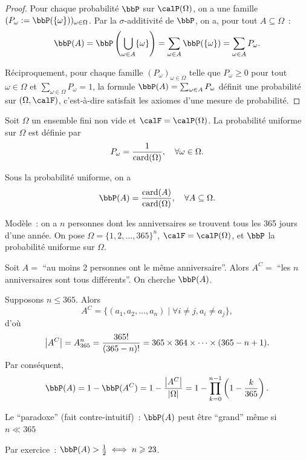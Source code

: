 \begin{proof}
    Pour chaque probabilité $\bbP$ sur $\calP(\Omega)$,
    on a une famille $(P_\omega := \bbP(\{ \omega \}))_{\omega \in \Omega}$.
    Par la $\sigma$-additivité de $\bbP$, on a, pour tout $A \subseteq \Omega$~:
    \[ \bbP(A) = \bbP \left(\bigcup_{\omega \in A} \{ \omega \} \right)
        = \sum_{\omega \in A} \bbP(\{ \omega \}) = \sum_{\omega \in A} P_\omega. \]

    Réciproquement, pour chaque famille $(P_\omega)_{\omega \in \Omega}$ telle que
    $P_\omega \geqslant 0$ pour tout $\omega \in \Omega$ et $\sum_{\omega \in \Omega} P_\omega = 1$,
    la formule $\bbP(A) = \sum_{\omega \in A} P_\omega$ définit une probabilité sur $(\Omega, \calF)$,
    c'est-à-dire satisfait les axiomes d'une mesure de probabilité.
\end{proof}

\begin{exem}
    Soit $\Omega$ un ensemble fini non vide et $\calF = \calP(\Omega)$.
    La probabilité uniforme sur $\Omega$ est définie par
    \[ P_\omega = \frac{1}{\operatorname{card}(\Omega)}, \quad \forall \omega \in \Omega. \]

    Sous la probabilité uniforme, on a
    \[ \bbP(A) = \frac{\card(A)}{\card(\Omega)}, \quad \forall A \subseteq \Omega. \]
\end{exem}

\begin{exem}
    Modèle~: on a $n$ personnes dont les anniversaires se trouvent tous les 365 jours d'une année.
    On pose $\Omega = \{ 1, 2, \ldots, 365 \}^n$, $\calF = \calP(\Omega)$, et $\bbP$ la probabilité uniforme sur $\Omega$.

    Soit $A =$ ``au moins 2 personnes ont le même anniversaire''.
    Alors $A^C =$ ``les $n$ anniversaires sont tous différents''.
    On cherche $\bbP(A)$.

    Supposons $n \leqslant 365$. Alors
    \[ A^C = \{ (a_1, a_2, \ldots, a_n) \mid \forall i \neq j, a_i \neq a_j \}, \]
    d'où
    \[ \left\lvert A^C \right\rvert = A_{365}^n = \frac{365!}{(365-n)!} = 365 \times 364 \times \cdots \times (365 - n + 1). \]
    Par conséquent,
    \[ \bbP(A) = 1 - \bbP(A^C) = 1 - \frac{\lrvert{A^C}}{\lrvert{\Omega}}
        = 1 - \prod_{k = 0}^{n - 1}\left(1 - \frac{k}{365}\right). \]

    Le ``paradoxe'' (fait contre-intuitif)~: $\bbP(A)$ peut être ``grand'' même si $n \ll 365$

    Par exercice~: $\bbP(A) > \frac{1}{2} \iff n \geqslant 23$.
\end{exem}

